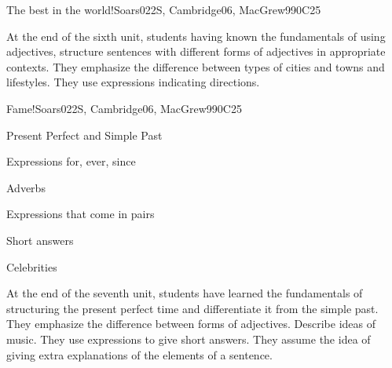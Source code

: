 \begin{syllabus}
\begin{unit}{The best in the world!}{}{Soars022S, Cambridge06, MacGrew99}{0}{C25}
   \begin{learningoutcomes}
      \item At the end of the sixth unit, students having known the fundamentals of using adjectives, structure sentences with different forms of adjectives in appropriate contexts. They emphasize the difference between types of cities and towns and lifestyles. They use expressions indicating directions.
   \end{learningoutcomes}

\end{unit}

\begin{unit}{Fame!}{}{Soars022S, Cambridge06, MacGrew99}{0}{C25}
   \begin{topics}
      \item Present Perfect and Simple Past
      \item Expressions for, ever, since
      \item Adverbs
      \item Expressions that come in pairs
      \item Short answers
      \item Celebrities
   \end{topics}

   \begin{learningoutcomes}
      \item At the end of the seventh unit, students have learned the fundamentals of structuring the present perfect time and differentiate it from the simple past. They emphasize the difference between forms of adjectives. Describe ideas of music. They use expressions to give short answers. They assume the idea of giving extra explanations of the elements of a sentence.
   \end{learningoutcomes}
\end{unit}

\begin{coursebibliography}
\end{coursebibliography}

\end{syllabus}
%
